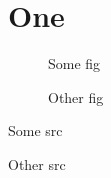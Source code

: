 \documentclass[a4paper]{abnt}
\begin{document}
\frontmatter

\listoffigures
\clearpage
\listofsources

\mainmatter

\chapter{One}   

\begin{figure} \caption{Some  fig} \end{figure}
\begin{figure} \caption{Other fig} \end{figure}

\begin{source} \caption{Some  src} \end{source}
\begin{source} \caption{Other src} \end{source}
\end{document}
